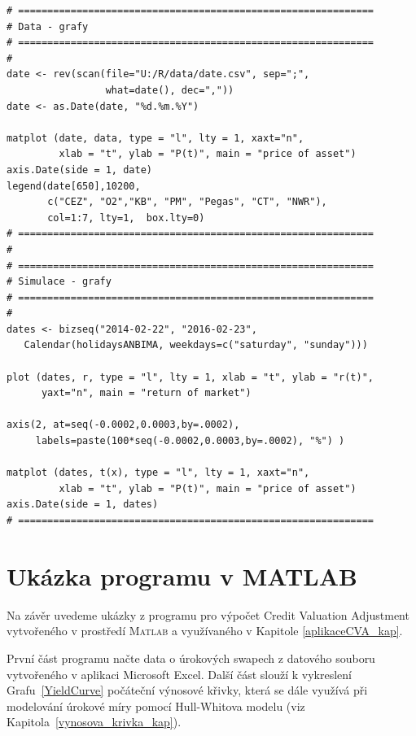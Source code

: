 \documentclass[a4paper,12pt]{report}
\theoremstyle{definition} \newtheorem{definice}[veta]{Definice}
\theoremstyle{remark}
\newcommand{\MATLAB}{\textsc{Matlab}\xspace}
\begin{document}
\begin{verbatim}
# =============================================================
# Data - grafy
# =============================================================
#
date <- rev(scan(file="U:/R/data/date.csv", sep=";", 
                 what=date(), dec=","))
date <- as.Date(date, "%d.%m.%Y") 

matplot (date, data, type = "l", lty = 1, xaxt="n", 
         xlab = "t", ylab = "P(t)", main = "price of asset")
axis.Date(side = 1, date)
legend(date[650],10200, 
       c("CEZ", "O2","KB", "PM", "Pegas", "CT", "NWR"), 
       col=1:7, lty=1,  box.lty=0) 
# =============================================================
#
# =============================================================
# Simulace - grafy
# =============================================================
#
dates <- bizseq("2014-02-22", "2016-02-23",
   Calendar(holidaysANBIMA, weekdays=c("saturday", "sunday")))

plot (dates, r, type = "l", lty = 1, xlab = "t", ylab = "r(t)", 
      yaxt="n", main = "return of market")

axis(2, at=seq(-0.0002,0.0003,by=.0002), 
     labels=paste(100*seq(-0.0002,0.0003,by=.0002), "%") )

matplot (dates, t(x), type = "l", lty = 1, xaxt="n", 
         xlab = "t", ylab = "P(t)", main = "price of asset")
axis.Date(side = 1, dates)
# =============================================================
\end{verbatim}

\newpage
\section*{Ukázka programu v MATLAB}
\addcontentsline{toc}{section}{Ukázka programu v \MATLAB}
Na závěr uvedeme ukázky z programu pro výpočet Credit Valuation Adjustment  vytvořeného v prostředí \MATLAB a využívaného v Kapitole \ref{aplikaceCVA_kap}.

První část programu načte data o úrokových swapech z datového souboru vytvořeného v aplikaci Microsoft Excel. 
Další část slouží k vykreslení Grafu~\ref{YieldCurve} počáteční výnosové křivky, která se dále využívá při modelování úrokové míry pomocí Hull-Whitova modelu (viz Kapitola~\ref{vynosova_krivka_kap}).
\end{document}
